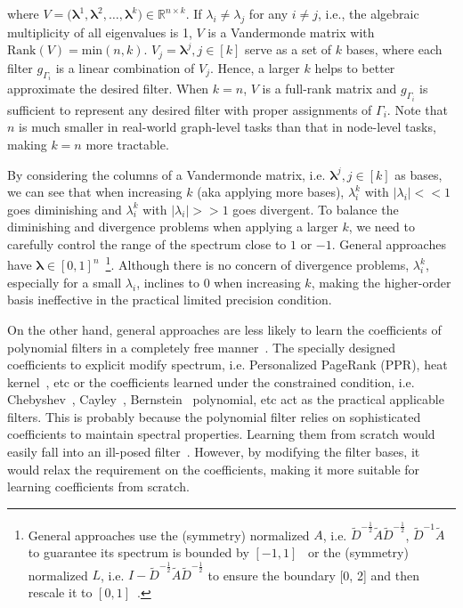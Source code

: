 \documentclass[nohyperref]{article}
\theoremstyle{plain}
\theoremstyle{definition}
\theoremstyle{remark}
\begin{document}
where $V=\bigl(\bm\lambda^1,\bm\lambda^2,\dots,\bm\lambda^k\bigr)\in\mathbb R^{n\times k}$.
If $\lambda_i\neq\lambda_j$ for any $i\neq j$, i.e., the algebraic multiplicity of all eigenvalues is 1, $V$ is a Vandermonde matrix with $\textrm{Rank}(V)=\textrm{min}(n, k)$.
$V_j=\bm\lambda^j, j\in[k]$ serve as a set of $k$ bases, where each filter $g_{\Gamma_i}$ is a linear combination of $V_j$.
Hence, a larger $k$ helps to better approximate the desired filter.
When $k=n$, $V$ is a full-rank matrix and $g_{\Gamma_i}$ is sufficient to represent any desired filter with proper assignments of $\Gamma_i$.
Note that $n$ is much smaller in real-world graph-level tasks than that in node-level tasks, making $k=n$ more tractable.

By considering the columns of a Vandermonde matrix, i.e. $\bm\lambda^j, j\in[k]$ as bases, we can see that when increasing $k$ (aka applying more bases), $\lambda_i^k$ with $|\lambda_i|<<1$ goes diminishing and $\lambda_i^k$ with $|\lambda_i|>>1$ goes divergent.
To balance the diminishing and divergence problems when applying a larger $k$, we need to carefully control the range of the spectrum close to $1$ or $-1$.
General approaches have $\bm\lambda\in[0, 1]^n$~\footnote{General approaches use the (symmetry) normalized $A$, i.e. $\tilde D^{-\frac{1}{2}}\tilde A\tilde D^{-\frac{1}{2}}$, $\tilde D^{-1}\tilde A$ to guarantee its spectrum is bounded by $[-1, 1]$~\cite{kipf2017semi,klicpera2019diffusion} or the (symmetry) normalized $L$, i.e. $I-\tilde D^{-\frac{1}{2}}\tilde A\tilde D^{-\frac{1}{2}}$ to ensure the boundary [0, 2] and then rescale it to $[0, 1]$~\cite{he2021bernnet}.}.
Although there is no concern of divergence problems, $\lambda_i^k$, especially for a small $\lambda_i$, inclines to 0 when increasing $k$,
making the higher-order basis ineffective in the practical limited precision condition.

On the other hand, general approaches are less likely to learn the coefficients of polynomial filters in a completely free manner~\cite{klicpera2019diffusion,he2021bernnet}.
The specially designed coefficients to explicit modify spectrum, i.e. Personalized PageRank (PPR), heat kernel~\cite{klicpera2019diffusion}, etc or the coefficients learned under the constrained condition, i.e. Chebyshev~\cite{defferrard2016convolutional}, Cayley~\cite{8521593}, Bernstein~\cite{he2021bernnet} polynomial, etc act as the practical applicable filters.
This is probably because the polynomial filter relies on sophisticated coefficients to maintain spectral properties.
Learning them from scratch would easily fall into an ill-posed filter~\cite{he2021bernnet}.
However, by modifying the filter bases, it would relax the requirement on the coefficients, making it more suitable for learning coefficients from scratch.
\end{document}
